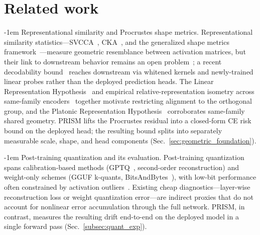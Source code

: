 \documentclass{article} %
\makeatletter
\newlength{\paraSpace}
\renewcommand{\paragraph}{\@startsection{paragraph}{4}{\z@}%
  {\paraSpace}{-1em}%
  {\normalfont\normalsize\bfseries}}
\makeatother
\begin{document}
% 


\section{Related work}

\paragraph{Representational similarity and Procrustes shape metrics.}
Representational similarity statistics---SVCCA~\citep{raghu2017svcca}, CKA~\citep{kornblith2019similarity}, and the generalized shape metrics framework~\citep{williams2021generalized}---measure geometric resemblance between activation matrices, but their link to downstream behavior remains an open problem~\citep{ding2021grounding, davari2023reliability, klabunde2023similarity}; a recent decodability bound~\citep{harvey2024what} reaches downstream via whitened kernels and newly-trained linear probes rather than the deployed prediction heads. The Linear Representation Hypothesis~\citep{park2023linear} and empirical relative-representation isometry across same-family encoders~\citep{moschella2022relative} together motivate restricting alignment to the orthogonal group, and the Platonic Representation Hypothesis~\citep{huh2024platonic} corroborates same-family shared geometry. PRISM lifts the Procrustes residual into a closed-form CE risk bound on the deployed head; the resulting bound splits into separately measurable scale, shape, and head components (Sec.~\ref{sec:geometric_foundation}).

\paragraph{Post-training quantization and its evaluation.}
Post-training quantization spans calibration-based methods (GPTQ~\citep{frantar2022gptq}, second-order reconstruction) and weight-only schemes (GGUF k-quants, BitsAndBytes~\citep{dettmers2022gpt3}), with low-bit performance often constrained by activation outliers~\citep{xiao2023smoothquant}. Existing cheap diagnostics---layer-wise reconstruction loss or weight quantization error---are indirect proxies that do not account for nonlinear error accumulation through the full network. PRISM, in contrast, measures the resulting drift end-to-end on the deployed model in a single forward pass (Sec.~\ref{subsec:quant_exp}).
\end{document}
